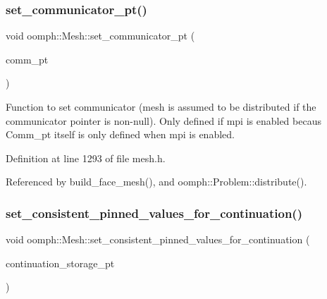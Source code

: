 \mbox{\label{classoomph_1_1Mesh_aa5684cde011ba20382e719e63a1329eb}} 
\subsubsection{\texorpdfstring{set\+\_\+communicator\+\_\+pt()}{set\_communicator\_pt()}}
{\footnotesize\ttfamily void oomph\+::\+Mesh\+::set\+\_\+communicator\+\_\+pt (\begin{DoxyParamCaption}\item[{\hyperlink{classoomph_1_1OomphCommunicator}{Oomph\+Communicator} $\ast$}]{comm\+\_\+pt }\end{DoxyParamCaption})\hspace{0.3cm}{\ttfamily [inline]}}

Function to set communicator (mesh is assumed to be distributed if the communicator pointer is non-\/null). Only defined if mpi is enabled becaus Comm\+\_\+pt itself is only defined when mpi is enabled. 

Definition at line 1293 of file mesh.\+h.



Referenced by build\+\_\+face\+\_\+mesh(), and oomph\+::\+Problem\+::distribute().

\mbox{\label{classoomph_1_1Mesh_ac8d6a5dcf3af2df66625079975d84c19}} 
\subsubsection{\texorpdfstring{set\+\_\+consistent\+\_\+pinned\+\_\+values\+\_\+for\+\_\+continuation()}{set\_consistent\_pinned\_values\_for\_continuation()}}
{\footnotesize\ttfamily void oomph\+::\+Mesh\+::set\+\_\+consistent\+\_\+pinned\+\_\+values\+\_\+for\+\_\+continuation (\begin{DoxyParamCaption}\item[{\hyperlink{classoomph_1_1ContinuationStorageScheme}{Continuation\+Storage\+Scheme} $\ast$const \&}]{continuation\+\_\+storage\+\_\+pt }\end{DoxyParamCaption})}



